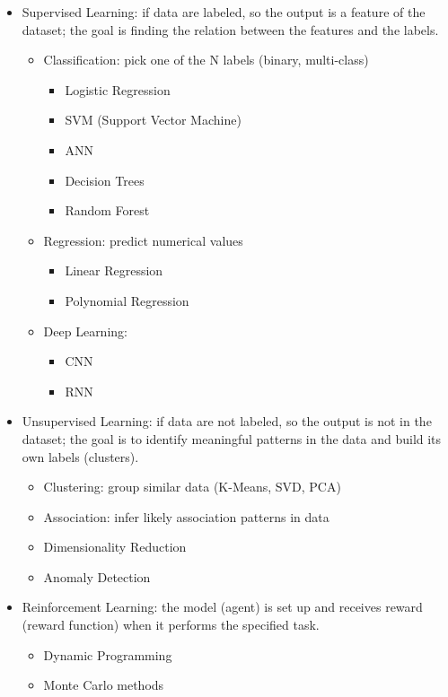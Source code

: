 \begin{itemize}
    \item Supervised Learning: if data are labeled, so the output is a feature of the dataset; the goal is finding the relation between the features and the labels.
        \begin{itemize}
            \item Classification: pick one of the N labels (binary, multi-class)
                \begin{itemize}
                    \item Logistic Regression
                    \item SVM (Support Vector Machine)
                    \item ANN
                    \item Decision Trees
                    \item Random Forest
                \end{itemize}
            \item Regression: predict numerical values
                \begin{itemize}
                    \item Linear Regression
                    \item Polynomial Regression
                \end{itemize}
            \item Deep Learning:
                \begin{itemize}
                    \item CNN
                    \item RNN
                \end{itemize}
        \end{itemize}
    \item Unsupervised Learning: if data are not labeled, so the output is not in the dataset; the goal is to identify meaningful patterns in the data and build its own labels (clusters).
        \begin{itemize}
            \item Clustering: group similar data (K-Means, SVD, PCA)
            \item Association: infer likely association patterns in data
            \item Dimensionality Reduction
            \item Anomaly Detection
        \end{itemize}
    \item Reinforcement Learning: the model (agent) is set up and receives reward (reward function) when it performs the specified task.
        \begin{itemize}
            \item Dynamic Programming
            \item Monte Carlo methods
        \end{itemize}
\end{itemize}



